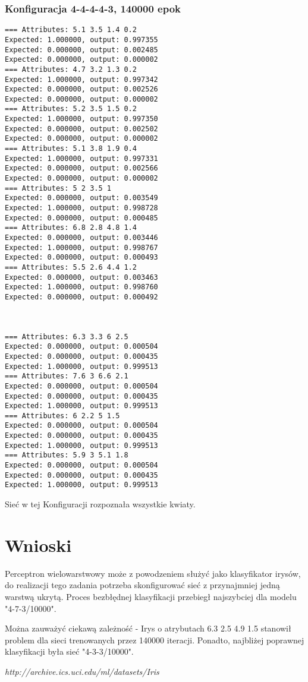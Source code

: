 \documentclass{classrep}
\begin{document}
\subsubsection{Konfiguracja 4-4-4-4-3, 140000 epok}
\begin{lstlisting}[basicstyle=\small]
=== Attributes: 5.1 3.5 1.4 0.2 
Expected: 1.000000, output: 0.997355
Expected: 0.000000, output: 0.002485
Expected: 0.000000, output: 0.000002
=== Attributes: 4.7 3.2 1.3 0.2 
Expected: 1.000000, output: 0.997342
Expected: 0.000000, output: 0.002526
Expected: 0.000000, output: 0.000002
=== Attributes: 5.2 3.5 1.5 0.2 
Expected: 1.000000, output: 0.997350
Expected: 0.000000, output: 0.002502
Expected: 0.000000, output: 0.000002
=== Attributes: 5.1 3.8 1.9 0.4 
Expected: 1.000000, output: 0.997331
Expected: 0.000000, output: 0.002566
Expected: 0.000000, output: 0.000002
=== Attributes: 5 2 3.5 1 
Expected: 0.000000, output: 0.003549
Expected: 1.000000, output: 0.998728
Expected: 0.000000, output: 0.000485
=== Attributes: 6.8 2.8 4.8 1.4 
Expected: 0.000000, output: 0.003446
Expected: 1.000000, output: 0.998767
Expected: 0.000000, output: 0.000493
=== Attributes: 5.5 2.6 4.4 1.2 
Expected: 0.000000, output: 0.003463
Expected: 1.000000, output: 0.998760
Expected: 0.000000, output: 0.000492



=== Attributes: 6.3 3.3 6 2.5 
Expected: 0.000000, output: 0.000504
Expected: 0.000000, output: 0.000435
Expected: 1.000000, output: 0.999513
=== Attributes: 7.6 3 6.6 2.1 
Expected: 0.000000, output: 0.000504
Expected: 0.000000, output: 0.000435
Expected: 1.000000, output: 0.999513
=== Attributes: 6 2.2 5 1.5 
Expected: 0.000000, output: 0.000504
Expected: 0.000000, output: 0.000435
Expected: 1.000000, output: 0.999513
=== Attributes: 5.9 3 5.1 1.8 
Expected: 0.000000, output: 0.000504
Expected: 0.000000, output: 0.000435
Expected: 1.000000, output: 0.999513
\end{lstlisting}

Sieć w tej Konfiguracji rozpoznała wszystkie kwiaty.

\section{Wnioski}
Perceptron wielowarstwowy może z powodzeniem służyć jako klasyfikator irysów, do realizacji tego zadania potrzeba skonfigurować sieć z przynajmniej jedną warstwą ukrytą. Proces bezbłędnej klasyfikacji przebiegł najszybciej dla modelu "4-7-3/10000".


Można zauważyć ciekawą zależność - Irys o atrybutach 6.3 2.5 4.9 1.5 stanowił problem dla sieci trenowanych przez 140000 iteracji. Ponadto, najbliżej poprawnej klasyfikacji była sieć "4-3-3/10000".
\begin{thebibliography}{0}
    \textsl{http://archive.ics.uci.edu/ml/datasets/Iris}
\end{thebibliography}
\end{document}
